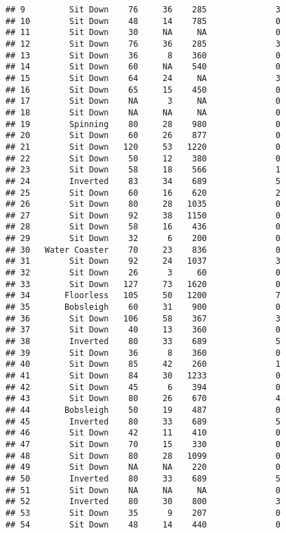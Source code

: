 \documentclass[
]{article}
\begin{document}
\begin{verbatim}
## 9         Sit Down    76     36    285              3
## 10        Sit Down    48     14    785              0
## 11        Sit Down    30     NA     NA              0
## 12        Sit Down    76     36    285              3
## 13        Sit Down    36      8    360              0
## 14        Sit Down    60     NA    540              0
## 15        Sit Down    64     24     NA              3
## 16        Sit Down    65     15    450              0
## 17        Sit Down    NA      3     NA              0
## 18        Sit Down    NA     NA     NA              0
## 19        Spinning    80     28    980              0
## 20        Sit Down    60     26    877              0
## 21        Sit Down   120     53   1220              0
## 22        Sit Down    50     12    380              0
## 23        Sit Down    58     18    566              1
## 24        Inverted    83     34    689              5
## 25        Sit Down    60     16    620              2
## 26        Sit Down    80     28   1035              0
## 27        Sit Down    92     38   1150              0
## 28        Sit Down    58     16    436              0
## 29        Sit Down    32      6    200              0
## 30   Water Coaster    70     23    836              0
## 31        Sit Down    92     24   1037              3
## 32        Sit Down    26      3     60              0
## 33        Sit Down   127     73   1620              0
## 34       Floorless   105     50   1200              7
## 35       Bobsleigh    60     31    900              0
## 36        Sit Down   106     58    367              3
## 37        Sit Down    40     13    360              0
## 38        Inverted    80     33    689              5
## 39        Sit Down    36      8    360              0
## 40        Sit Down    85     42    260              1
## 41        Sit Down    84     30   1233              0
## 42        Sit Down    45      6    394              0
## 43        Sit Down    80     26    670              4
## 44       Bobsleigh    50     19    487              0
## 45        Inverted    80     33    689              5
## 46        Sit Down    42     11    410              0
## 47        Sit Down    70     15    330              0
## 48        Sit Down    80     28   1099              0
## 49        Sit Down    NA     NA    220              0
## 50        Inverted    80     33    689              5
## 51        Sit Down    NA     NA     NA              0
## 52        Inverted    80     30    800              3
## 53        Sit Down    35      9    207              0
## 54        Sit Down    48     14    440              0

\end{verbatim}
\end{document}
